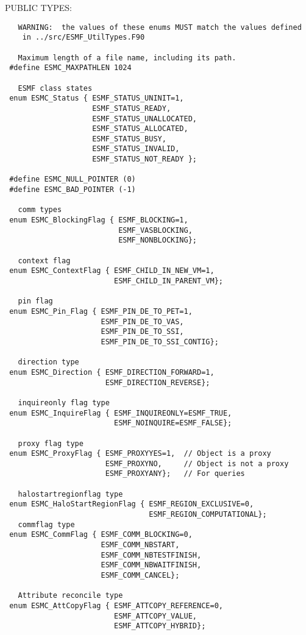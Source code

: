 \begin{verbatim} \end{verbatim}{\sf PUBLIC TYPES:}
\begin{verbatim} 
   WARNING:  the values of these enums MUST match the values defined
    in ../src/ESMF_UtilTypes.F90
 
   Maximum length of a file name, including its path.
 #define ESMC_MAXPATHLEN 1024
 
   ESMF class states
 enum ESMC_Status { ESMF_STATUS_UNINIT=1,
                    ESMF_STATUS_READY,
                    ESMF_STATUS_UNALLOCATED,
                    ESMF_STATUS_ALLOCATED,
                    ESMF_STATUS_BUSY,
                    ESMF_STATUS_INVALID,
                    ESMF_STATUS_NOT_READY };
 
 #define ESMC_NULL_POINTER (0)
 #define ESMC_BAD_POINTER (-1)
 
   comm types
 enum ESMC_BlockingFlag { ESMF_BLOCKING=1,
                          ESMF_VASBLOCKING,
                          ESMF_NONBLOCKING};
 
   context flag
 enum ESMC_ContextFlag { ESMF_CHILD_IN_NEW_VM=1,
                         ESMF_CHILD_IN_PARENT_VM};
 
   pin flag
 enum ESMC_Pin_Flag { ESMF_PIN_DE_TO_PET=1,
                      ESMF_PIN_DE_TO_VAS,
                      ESMF_PIN_DE_TO_SSI,
                      ESMF_PIN_DE_TO_SSI_CONTIG};
 
   direction type
 enum ESMC_Direction { ESMF_DIRECTION_FORWARD=1,
                       ESMF_DIRECTION_REVERSE};
 
   inquireonly flag type
 enum ESMC_InquireFlag { ESMF_INQUIREONLY=ESMF_TRUE,
                         ESMF_NOINQUIRE=ESMF_FALSE};
 
   proxy flag type
 enum ESMC_ProxyFlag { ESMF_PROXYYES=1,  // Object is a proxy
                       ESMF_PROXYNO,     // Object is not a proxy
                       ESMF_PROXYANY};   // For queries
 
   halostartregionflag type
 enum ESMC_HaloStartRegionFlag { ESMF_REGION_EXCLUSIVE=0,
                                 ESMF_REGION_COMPUTATIONAL};
   commflag type
 enum ESMC_CommFlag { ESMF_COMM_BLOCKING=0,
                      ESMF_COMM_NBSTART,
                      ESMF_COMM_NBTESTFINISH,
                      ESMF_COMM_NBWAITFINISH,
                      ESMF_COMM_CANCEL};
 
   Attribute reconcile type
 enum ESMC_AttCopyFlag { ESMF_ATTCOPY_REFERENCE=0,
                         ESMF_ATTCOPY_VALUE,
                         ESMF_ATTCOPY_HYBRID};
 

\end{verbatim}
